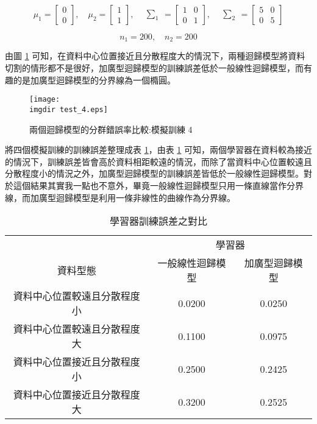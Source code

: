 \[\mu_1 = \begin{bmatrix}
0 \\
0
\end{bmatrix}, \quad \mu_2 = \begin{bmatrix}
1 \\
1
\end{bmatrix}, \quad \begin{matrix} \sum_{1} \end{matrix} = \begin{bmatrix}
1 & 0\\
0 & 1
\end{bmatrix}, \quad \begin{matrix} \sum_{2} \end{matrix} = \begin{bmatrix}
5 & 0\\
0 & 5
\end{bmatrix}\]

\[n_1 = 200, \quad n_2 = 200\]

由圖 \ref{fig:test_4} 可知，在資料中心位置接近且分散程度大的情況下，兩種迴歸模型將資料切割的情形都不是很好，加廣型迴歸模型的訓練誤差低於一般線性迴歸模型，而有趣的是加廣型迴歸模型的分界線為一個橢圓。
\begin{figure}[H]
    \centering
        \texttt{[image: \\imgdir test\_4.eps]}
    \caption{兩個迴歸模型的分群錯誤率比較:模擬訓練 4}
    \label{fig:test_4}
\end{figure}

將四個模擬訓練的訓練誤差整理成表 \ref{tb:mis_1}，由表 \ref{tb:mis_1} 可知，兩個學習器在資料較為接近的情況下，訓練誤差皆會高於資料相距較遠的情況，而除了當資料中心位置較遠且分散程度小的情況之外，加廣型迴歸模型的訓練誤差皆低於一般線性迴歸模型。對於這個結果其實我一點也不意外，畢竟一般線性迴歸模型只用一條直線當作分界線，而加廣型迴歸模型是利用一條非線性的曲線作為分界線。

\begin{table}[H] 
\centering
\caption{學習器訓練誤差之對比}\label{tb:mis_1}
\tabcolsep=12pt
\begin{tabular}{ccc} 
\toprule
& \multicolumn{2}{c}{學習器}\\
\cmidrule(l){2-3}
資料型態 & 一般線性迴歸模型 & 加廣型迴歸模型 \\[3pt]
\midrule
資料中心位置較遠且分散程度小 & \cellcolor{red!25}0.0200 & 0.0250 \\[3pt]
資料中心位置較遠且分散程度大 & 0.1100 & \cellcolor{red!25}0.0975 \\[3pt]
資料中心位置接近且分散程度小 & 0.2500 & \cellcolor{red!25}0.2425 \\[3pt]
資料中心位置接近且分散程度大 & 0.3200 & \cellcolor{red!25}0.2525 \\ 
\bottomrule
\end{tabular}
\end{table}

